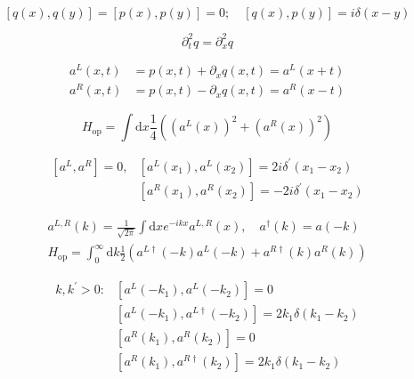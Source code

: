 \documentclass[main.tex]{subfiles}
\begin{document}
\begin{equation}\label{17.3}
	[q(x), q(y)]=[p(x), p(y)]=0 ; \quad[q(x), p(y)]=i \delta(x-y)
\end{equation}

\begin{equation}\label{17.4}
	\partial_{t}^2 q = \partial_{x}^2 q
\end{equation}

\begin{equation}\label{17.5}
	\begin{aligned} a^{L}(x, t) &=p(x, t)+\partial_{x} q(x, t)=a^{L}(x+t) \\ a^{R}(x, t) &=p(x, t)-\partial_{x} q(x, t)=a^{R}(x-t) \end{aligned}
\end{equation}

\begin{equation}\label{17.7}
	H_{\mathrm{op}}=\int \mathrm{d} x \frac{1}{4}\left(\left(a^{L}(x)\right)^{2}+\left(a^{R}(x)\right)^{2}\right)
\end{equation}

\begin{equation}\label{17.8}
	\begin{aligned}\left[a^{L}, a^{R}\right]=0, &\left[a^{L}\left(x_{1}\right), a^{L}\left(x_{2}\right)\right]=2 i \delta^{\prime}\left(x_{1}-x_{2}\right) \\ &\left[a^{R}\left(x_{1}\right), a^{R}\left(x_{2}\right)\right]=-2 i \delta^{\prime}\left(x_{1}-x_{2}\right) \end{aligned}
\end{equation}

\begin{equation}\label{17.9}
	\begin{array}{l}{a^{L, R}(k)=\frac{1}{\sqrt{2 \pi}} \int \mathrm{d} x e^{-i k x} a^{L, R}(x), \quad a^{\dagger}(k)=a(-k)} \\ {H_{\mathrm{op}}=\int_{0}^{\infty} \mathrm{d} k \frac{1}{2}\left(a^{L \dagger}(-k) a^{L}(-k)+a^{R \dagger}(k) a^{R}(k)\right)}\end{array}
\end{equation}

\begin{equation}\label{17.11}
	\begin{aligned} k, k^{\prime}>0: &\left[a^{L}\left(-k_{1}\right), a^{L}\left(-k_{2}\right)\right]=0 \\ &\left[a^{L}\left(-k_{1}\right), a^{L \dagger}\left(-k_{2}\right)\right]=2 k_{1} \delta\left(k_{1}-k_{2}\right) \\ &\left[a^{R}\left(k_{1}\right), a^{R}\left(k_{2}\right)\right]=0 \\ &\left[a^{R}\left(k_{1}\right), a^{R \dagger}\left(k_{2}\right)\right]=2 k_{1} \delta\left(k_{1}-k_{2}\right) \end{aligned}
\end{equation}
\end{document}
